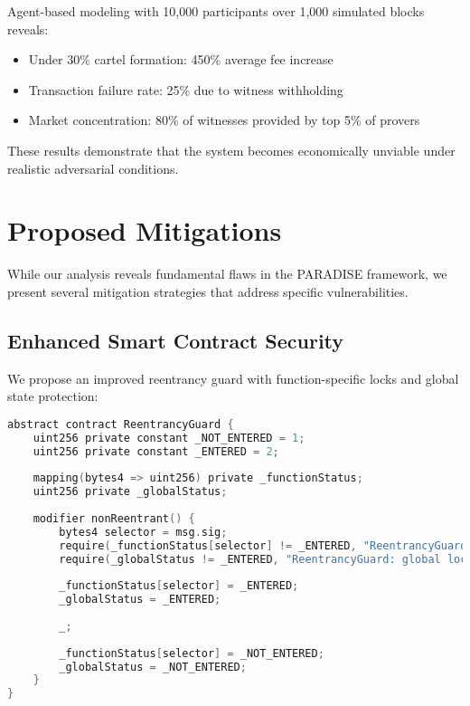 \documentclass{article}
\begin{document}
Agent-based modeling with 10,000 participants over 1,000 simulated blocks reveals:

\begin{itemize}
\item Under 30\% cartel formation: 450\% average fee increase
\item Transaction failure rate: 25\% due to witness withholding
\item Market concentration: 80\% of witnesses provided by top 5\% of provers
\end{itemize}

These results demonstrate that the system becomes economically unviable under realistic adversarial conditions.

\section{Proposed Mitigations}

While our analysis reveals fundamental flaws in the PARADISE framework, we present several mitigation strategies that address specific vulnerabilities.

\subsection{Enhanced Smart Contract Security}

We propose an improved reentrancy guard with function-specific locks and global state protection:

\begin{lstlisting}[language=C,caption={Enhanced Reentrancy Protection},label={lst:enhanced-guard}]
abstract contract ReentrancyGuard {
    uint256 private constant _NOT_ENTERED = 1;
    uint256 private constant _ENTERED = 2;
    
    mapping(bytes4 => uint256) private _functionStatus;
    uint256 private _globalStatus;
    
    modifier nonReentrant() {
        bytes4 selector = msg.sig;
        require(_functionStatus[selector] != _ENTERED, "ReentrancyGuard: reentrant call");
        require(_globalStatus != _ENTERED, "ReentrancyGuard: global lock active");
        
        _functionStatus[selector] = _ENTERED;
        _globalStatus = _ENTERED;
        
        _;
        
        _functionStatus[selector] = _NOT_ENTERED;
        _globalStatus = _NOT_ENTERED;
    }
}
\end{lstlisting}
\end{document}

